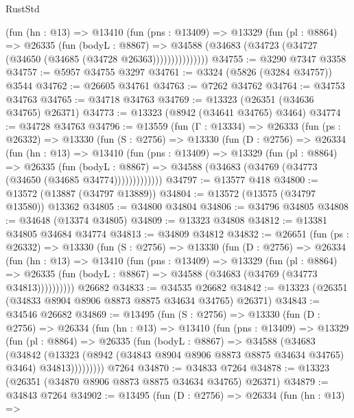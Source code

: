 \begin{lexlean}{RustStd}
\begin{coremodule}
              (fun (hn : @13) =>
              @13410
                (fun (pns : @13409) =>
                @13329
                  (fun (pl : @8864) =>
                  @26335
                    (fun (bodyL : @8867) =>
                    @34588 (@34683 (@34723 (@34727 (@34650 (@34685 (@34728 @26363)))))))))))))))
@34755 := @3290 @7347 @3358
@34757 := @5957 @34755 @3297
@34761 := @3324 (@5826 (@3284 @34757)) @3544
@34762 := @26605 @34761
@34763 := @7262 @34762
@34764 := @34753 @34763
@34765 := @34718 @34763
@34769 := @13323 (@26351 (@34636 @34765) @26371)
@34773 := @13323 (@8942 (@34641 @34765) @3464)
@34774 := @34728 @34763
@34796 := @13559
    (fun (Γ : @13334) =>
    @26333
      (fun (ps : @26332) =>
      @13330
        (fun (S : @2756) =>
        @13330
          (fun (D : @2756) =>
          @26334
            (fun (hn : @13) =>
            @13410
              (fun (pns : @13409) =>
              @13329
                (fun (pl : @8864) =>
                @26335
                  (fun (bodyL : @8867) =>
                  @34588 (@34683 (@34769 (@34773 (@34650 (@34685 @34774)))))))))))))
@34797 := @13577 @418
@34800 := @13572 (@13887 (@34797 @13889))
@34804 := @13572 (@13575 (@34797 @13580)) @13362
@34805 := @34800 @34804
@34806 := @34796 @34805
@34808 := @34648 (@13374 @34805)
@34809 := @13323 @34808
@34812 := @13381 @34805 @34684 @34774
@34813 := @34809 @34812
@34832 := @26651
    (fun (ps : @26332) =>
    @13330
      (fun (S : @2756) =>
      @13330
        (fun (D : @2756) =>
        @26334
          (fun (hn : @13) =>
          @13410
            (fun (pns : @13409) =>
            @13329
              (fun (pl : @8864) =>
              @26335 (fun (bodyL : @8867) => @34588 (@34683 (@34769 (@34773 @34813))))))))))
    @26682
@34833 := @34535 @26682
@34842 := @13323 (@26351 (@34833 @8904 @8906 @8873 @8875 @34634 @34765) @26371)
@34843 := @34546 @26682
@34869 := @13495
    (fun (S : @2756) =>
    @13330
      (fun (D : @2756) =>
      @26334
        (fun (hn : @13) =>
        @13410
          (fun (pns : @13409) =>
          @13329
            (fun (pl : @8864) =>
            @26335
              (fun (bodyL : @8867) =>
              @34588
                (@34683
                  (@34842
                    (@13323
                      (@8942 (@34843 @8904 @8906 @8873 @8875 @34634 @34765) @3464)
                      @34813)))))))))
    @7264
@34870 := @34833 @7264
@34878 := @13323 (@26351 (@34870 @8906 @8873 @8875 @34634 @34765) @26371)
@34879 := @34843 @7264
@34902 := @13495
    (fun (D : @2756) =>
    @26334
      (fun (hn : @13) =>

\end{coremodule}
\end{lexlean}
